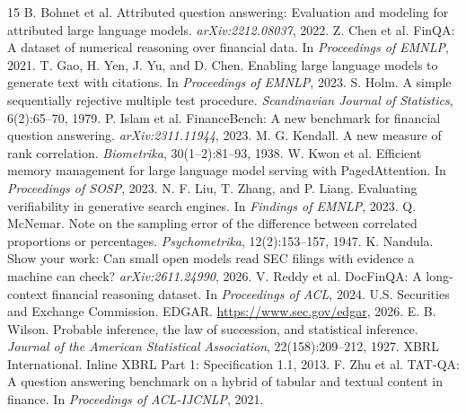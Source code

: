 \documentclass[11pt]{article}
\begin{document}
\begin{thebibliography}{15}
 B. Bohnet et al. Attributed question answering: Evaluation and modeling for attributed large language models. \emph{arXiv:2212.08037}, 2022.
 Z. Chen et al. FinQA: A dataset of numerical reasoning over financial data. In \emph{Proceedings of EMNLP}, 2021.
 T. Gao, H. Yen, J. Yu, and D. Chen. Enabling large language models to generate text with citations. In \emph{Proceedings of EMNLP}, 2023.
 S. Holm. A simple sequentially rejective multiple test procedure. \emph{Scandinavian Journal of Statistics}, 6(2):65--70, 1979.
 P. Islam et al. FinanceBench: A new benchmark for financial question answering. \emph{arXiv:2311.11944}, 2023.
 M. G. Kendall. A new measure of rank correlation. \emph{Biometrika}, 30(1--2):81--93, 1938.
 W. Kwon et al. Efficient memory management for large language model serving with PagedAttention. In \emph{Proceedings of SOSP}, 2023.
 N. F. Liu, T. Zhang, and P. Liang. Evaluating verifiability in generative search engines. In \emph{Findings of EMNLP}, 2023.
 Q. McNemar. Note on the sampling error of the difference between correlated proportions or percentages. \emph{Psychometrika}, 12(2):153--157, 1947.
 K. Nandula. Show your work: Can small open models read SEC filings with evidence a machine can check? \emph{arXiv:2611.24990}, 2026.
 V. Reddy et al. DocFinQA: A long-context financial reasoning dataset. In \emph{Proceedings of ACL}, 2024.
 U.S. Securities and Exchange Commission. EDGAR. \url{https://www.sec.gov/edgar}, 2026.
 E. B. Wilson. Probable inference, the law of succession, and statistical inference. \emph{Journal of the American Statistical Association}, 22(158):209--212, 1927.
 XBRL International. Inline XBRL Part 1: Specification 1.1, 2013.
 F. Zhu et al. TAT-QA: A question answering benchmark on a hybrid of tabular and textual content in finance. In \emph{Proceedings of ACL-IJCNLP}, 2021.
\end{thebibliography}
\end{document}
